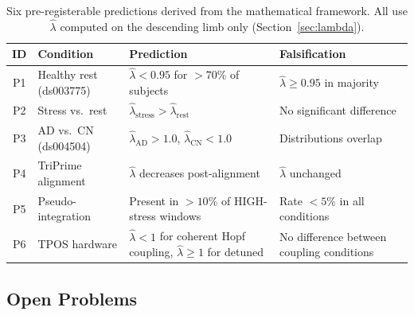 \documentclass[12pt,a4paper]{article}
\theoremstyle{plain}
\theoremstyle{definition}
\begin{document}
\begin{table}[h!]
  \centering
  \renewcommand{\arraystretch}{1.4}
  \begin{tabular}{clp{5.2cm}p{3.5cm}}
    \toprule
    \textbf{ID} & \textbf{Condition} & \textbf{Prediction} & \textbf{Falsification} \\
    \midrule
    P1 & Healthy rest (ds003775) &
      $\hat\lambda < 0.95$ for $>70\%$ of subjects &
      $\hat\lambda \ge 0.95$ in majority \\
    P2 & Stress vs.\ rest &
      $\hat\lambda_{\mathrm{stress}} > \hat\lambda_{\mathrm{rest}}$ &
      No significant difference \\
    P3 & AD vs.\ CN (ds004504) &
      $\hat\lambda_{\mathrm{AD}} > 1.0$, $\hat\lambda_{\mathrm{CN}} < 1.0$ &
      Distributions overlap \\
    P4 & TriPrime alignment &
      $\hat\lambda$ decreases post-alignment &
      $\hat\lambda$ unchanged \\
    P5 & Pseudo-integration &
      Present in $>10\%$ of HIGH-stress windows &
      Rate $<5\%$ in all conditions \\
    P6 & TPOS hardware &
      $\hat\lambda < 1$ for coherent Hopf coupling,
      $\hat\lambda \ge 1$ for detuned &
      No difference between coupling conditions \\
    \bottomrule
  \end{tabular}
  \caption{Six pre-registerable predictions derived from the mathematical framework.
           All use $\hat\lambda$ computed on the descending limb only (Section~\ref{sec:lambda}).}
  \label{tab:predictions}
\end{table}

\subsection{Open Problems}
\label{sec:open}
\end{document}
